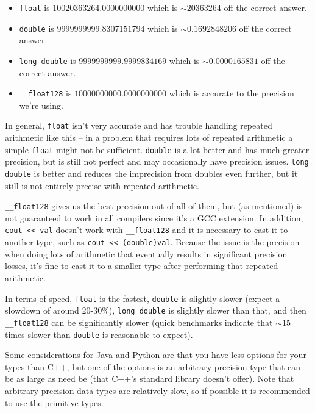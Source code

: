 \begin{itemize}
\item \texttt{float} is $10020363264.0000000000$ which is $\sim20363264$ off the correct answer.
\item \texttt{double} is $9999999999.8307151794$ which is $\sim0.1692848206$ off the correct answer.
\item \texttt{long double} is $9999999999.9999834169$ which is $\sim0.0000165831$ off the correct answer.
\item \texttt{__float128} is $10000000000.0000000000$ which is accurate to the precision we're using.
\end{itemize}

In general, \texttt{float} isn't very accurate and has trouble handling repeated arithmetic like this -- in a problem that requires lots of repeated arithmetic a simple \texttt{float} might not be sufficient. \texttt{double} is a lot better and has much greater precision, but is still not perfect and may occasionally have precision issues. \texttt{long double} is better and reduces the imprecision from doubles even further, but it still is not entirely precise with repeated arithmetic.

\texttt{__float128} gives us the best precision out of all of them, but (as mentioned) is not guaranteed to work in all compilers since it's a GCC extension. In addition, \texttt{cout << val} doesn't work with \texttt{__float128} and it is necessary to cast it to another type, such as \texttt{cout << (double)val}. Because the issue is the precision when doing lots of arithmetic that eventually results in significant precision losses, it's fine to cast it to a smaller type after performing that repeated arithmetic.

In terms of speed, \texttt{float} is the fastest, \texttt{double} is slightly slower (expect a slowdown of around 20-30\%), \texttt{long double} is slightly slower than that, and then \texttt{__float128} can be significantly slower (quick benchmarks indicate that $\sim15$ times slower than \texttt{double} is reasonable to expect).

Some considerations for Java and Python are that you have less options for your types than C++, but one of the options is an arbitrary precision type that can be as large as need be (that C++'s standard library doesn't offer). Note that arbitrary precision data types are relatively slow, so if possible it is recommended to use the primitive types.
